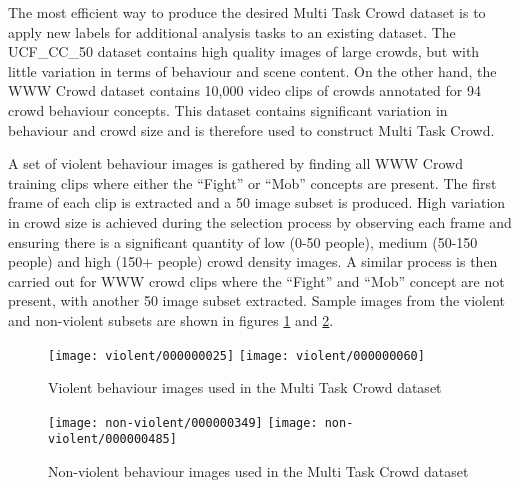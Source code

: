 \documentclass[10pt,twocolumn,letterpaper]{article}
\begin{document}
The most efficient way to produce the desired Multi Task Crowd dataset is to apply new labels for additional analysis tasks to an existing dataset. The UCF\_CC\_50 dataset contains high quality images of large crowds, but with little variation in terms of behaviour and scene content. On the other hand, the WWW Crowd dataset contains 10,000 video clips of crowds annotated for 94 crowd behaviour concepts. This dataset contains significant variation in behaviour and crowd size and is therefore used to construct Multi Task Crowd.



A set of violent behaviour images is gathered by finding all WWW Crowd training clips where either the ``Fight'' or ``Mob'' concepts are present. The first frame of each clip is extracted and a 50 image subset is produced. High variation in crowd size is achieved during the selection process by observing each frame and ensuring there is a significant quantity of low (0-50 people), medium (50-150 people)  and high (150+ people) crowd density images. A similar process is then carried out for WWW crowd clips where the ``Fight'' and ``Mob'' concept are not present, with another 50 image subset extracted. Sample images from the violent and non-violent subsets are shown in figures \ref{violent_samples}  and \ref{non_violent_samples}.

\begin{figure}[h!]
	\centering

    \texttt{[image: violent/000000025]}
    \texttt{[image: violent/000000060]}
    
   

    \caption{Violent behaviour images used in the Multi Task Crowd dataset}
    	\label{violent_samples}
\end{figure}

\begin{figure}[h!]
	\centering
	\texttt{[image: non-violent/000000349]}
      \texttt{[image: non-violent/000000485]}
    
   
	\caption{Non-violent behaviour images used in the Multi Task Crowd dataset}
    \label{non_violent_samples}
\end{figure}
\end{document}
